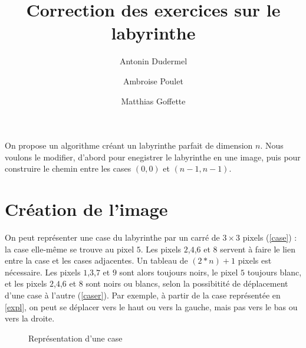 \documentclass[11pt,a4paper]{article}
\title{Correction des exercices sur le labyrinthe}
\date{}
\author{Antonin Dudermel \and Ambroise Poulet \and Matthias Goffette}
\begin{document}

\maketitle

\begin{it}
On propose un algorithme créant un labyrinthe parfait de dimension $n$. Nous voulons le modifier, d'abord pour enegistrer le labyrinthe en une image, puis pour construire le chemin entre les cases $(0,0)$ et $(n-1,n-1)$.
\end{it}

\section{Création de l'image}

On peut représenter une case du labyrinthe par un carré de $3\times3$ pixels (\ref{case}) : la case elle-même se trouve au pixel $5$. Les pixels $2$,$4$,$6$ et $8$ servent à faire le lien entre la case et les cases adjacentes. Un tableau de $(2*n)+1$ pixels est nécessaire. Les pixels $1$,$3$,$7$ et $9$ sont alors toujours noirs, le pixel $5$ toujours blanc, et les pixels $2$,$4$,$6$ et $8$ sont noirs ou blancs, selon la possibitité de déplacement d'une case à l'autre (\ref{caser}). Par exemple, à partir de la case représentée en \ref{expl}, on peut se déplacer vers le haut ou vers la gauche, mais pas vers le bas ou vers la droite.
\begin{figure}[h]
\begin{center}
\hfill
{}
\hfill
{}
\hfill
{}
\hfill \hbox{}
\caption{Représentation d'une case}

\end{center}
\end{figure}
\end{document}
